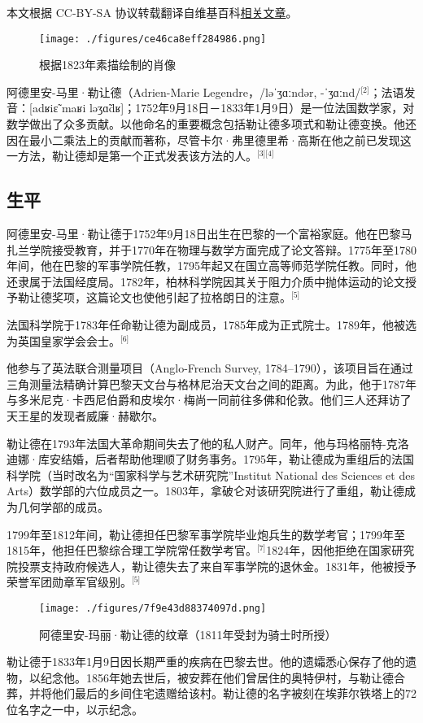 
本文根据 CC-BY-SA 协议转载翻译自维基百科\href{https://en.wikipedia.org/wiki/Adrien-Marie_Legendre}{相关文章}。

\begin{figure}[ht]
\centering
\texttt{[image: ./figures/ce46ca8eff284986.png]}
\caption{根据1823年素描绘制的肖像} \label{fig_adla_1}
\end{figure}
阿德里安-马里·勒让德（Adrien-Marie Legendre，/ləˈʒɑːndər, -ˈʒɑːnd/\(^\text{[2]}\)；法语发音：[adʁiɛ̃ maʁi ləʒɑ̃dʁ]；1752年9月18日－1833年1月9日）是一位法国数学家，对数学做出了众多贡献。以他命名的重要概念包括勒让德多项式和勒让德变换。他还因在最小二乘法上的贡献而著称，尽管卡尔·弗里德里希·高斯在他之前已发现这一方法，勒让德却是第一个正式发表该方法的人。\(^\text{[3][4]}\)
\subsection{生平}
阿德里安-马里·勒让德于1752年9月18日出生在巴黎的一个富裕家庭。他在巴黎马扎兰学院接受教育，并于1770年在物理与数学方面完成了论文答辩。1775年至1780年间，他在巴黎的军事学院任教，1795年起又在国立高等师范学院任教。同时，他还隶属于法国经度局。1782年，柏林科学院因其关于阻力介质中抛体运动的论文授予勒让德奖项，这篇论文也使他引起了拉格朗日的注意。\(^\text{[5]}\)

法国科学院于1783年任命勒让德为副成员，1785年成为正式院士。1789年，他被选为英国皇家学会会士。\(^\text{[6]}\)

他参与了英法联合测量项目（Anglo-French Survey, 1784–1790），该项目旨在通过三角测量法精确计算巴黎天文台与格林尼治天文台之间的距离。为此，他于1787年与多米尼克·卡西尼伯爵和皮埃尔·梅尚一同前往多佛和伦敦。他们三人还拜访了天王星的发现者威廉·赫歇尔。

勒让德在1793年法国大革命期间失去了他的私人财产。同年，他与玛格丽特-克洛迪娜·库安结婚，后者帮助他理顺了财务事务。1795年，勒让德成为重组后的法国科学院（当时改名为“国家科学与艺术研究院”Institut National des Sciences et des Arts）数学部的六位成员之一。1803年，拿破仑对该研究院进行了重组，勒让德成为几何学部的成员。

1799年至1812年间，勒让德担任巴黎军事学院毕业炮兵生的数学考官；1799年至1815年，他担任巴黎综合理工学院常任数学考官。\(^\text{[7]}\)1824年，因他拒绝在国家研究院投票支持政府候选人，勒让德失去了来自军事学院的退休金。1831年，他被授予荣誉军团勋章军官级别。\(^\text{[5]}\)
\begin{figure}[ht]
\centering
\texttt{[image: ./figures/7f9e43d88374097d.png]}
\caption{阿德里安-玛丽·勒让德的纹章（1811年受封为骑士时所授）} \label{fig_adla_2}
\end{figure}
勒让德于1833年1月9日因长期严重的疾病在巴黎去世。他的遗孀悉心保存了他的遗物，以纪念他。1856年她去世后，被安葬在他们曾居住的奥特伊村，与勒让德合葬，并将他们最后的乡间住宅遗赠给该村。勒让德的名字被刻在埃菲尔铁塔上的72位名字之一中，以示纪念。
